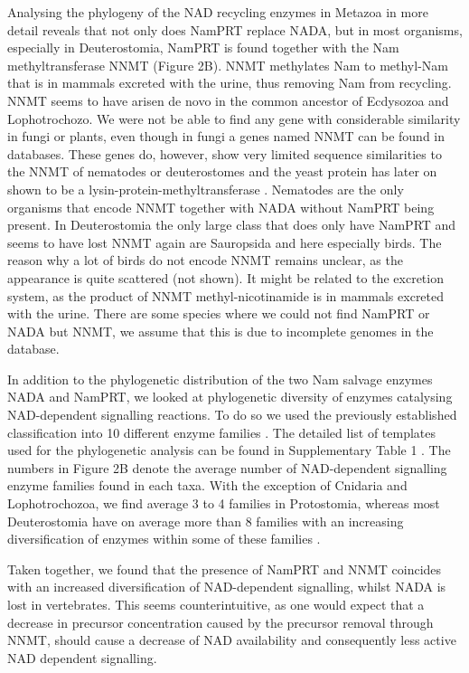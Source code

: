Analysing the phylogeny of the NAD recycling enzymes in Metazoa in more detail reveals that not only does NamPRT replace NADA, but in most organisms, especially in Deuterostomia, NamPRT is found together with the Nam methyltransferase NNMT (Figure 2B). NNMT methylates Nam to methyl-Nam that is in mammals excreted with the urine, thus removing Nam from recycling. NNMT seems to have arisen de novo in the common ancestor of Ecdysozoa and Lophotrochozo.  We were not be able to find any gene with considerable similarity in fungi or plants, even though in fungi a genes named NNMT can be found in databases. These genes do, however, show very limited sequence similarities to the NNMT of nematodes or deuterostomes and the yeast protein has later on shown to be a lysin-protein-methyltransferase \cite{Wlodarski2011}. Nematodes are the only organisms that encode NNMT together with NADA without NamPRT being present. In Deuterostomia the only large class that does only have NamPRT and seems to have lost NNMT again are Sauropsida and here especially birds. The reason why a lot of birds do not encode NNMT remains unclear, as the appearance is quite scattered (not shown). It might be related to the excretion system, as the product of NNMT methyl-nicotinamide is in mammals excreted with the urine. There are some species where we could not find NamPRT or NADA but NNMT, we assume that this is due to incomplete genomes in the database.

In addition to the phylogenetic distribution of the two Nam salvage enzymes NADA and NamPRT, we looked at phylogenetic diversity of enzymes catalysing NAD-dependent signalling reactions. To do so we used the previously established classification into 10 different enzyme families \cite{Gossmann2012FEBS}. The detailed list of templates used for the phylogenetic analysis can be found in  Supplementary Table 1 . The numbers in Figure 2B denote the average number of NAD-dependent signalling enzyme families found in each taxa. With the exception of Cnidaria and Lophotrochozoa, we find average 3 to 4 families in Protostomia, whereas most Deuterostomia have on average more than 8 families with an increasing diversification of enzymes within some of these families \cite{Gossmann2014DNAR}.

Taken together, we found that the presence of NamPRT and NNMT coincides with an increased diversification of NAD-dependent signalling, whilst NADA is lost in vertebrates. This seems  counterintuitive, as one would expect that a decrease in precursor concentration caused by the precursor removal through NNMT, should cause a decrease of NAD availability and consequently less active NAD dependent signalling.


